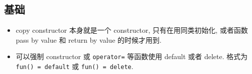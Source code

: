 
\begin{issues}
\issueDraft
\end{issues}

\subsection{基础}
\begin{itemize}
\item copy constructor 本身就是一个 constructor, 只有在用同类初始化, 或者函数 pass by value 和 return by value 的时候才用到.
\item 可以强制 constructor 或 \verb|operator=| 等函数使用 default 或者 delete. 格式为 \verb|fun() = default| 或 \verb|fun() = delete|.
\end{itemize}

